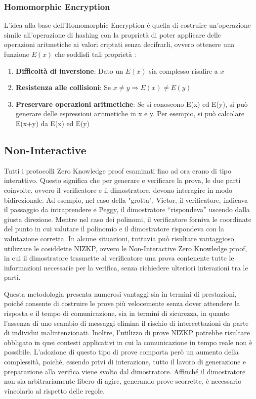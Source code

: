 \subsubsection{Homomorphic Encryption}

L'idea alla base dell'Homomorphic Encryption è quella di costruire un'operazione simile all'operazione di hashing con la
proprietà di poter applicare delle operazioni aritmetiche ai valori criptati senza decifrarli, ovvero ottenere una
funzione $E(x)$ che soddisfi tali proprietà :
\begin{enumerate}
    \item \textbf{Difficoltà di inversione}: Dato un  $E(x)$ sia complesso risalire a $x$
    \item \textbf{Resistenza alle collisioni}: Se $x \ne y \Rightarrow E(x) \ne E(y)$
    \item \textbf{Preservare operazioni aritmetiche}: Se si conoscono E(x) ed E(y), si può generare
    delle espressioni aritmetiche in x e y. Per esempio, si può calcolare E(x+y) da E(x) ed E(y)
\end{enumerate}
\clearpage

\subsection{Non-Interactive}
\label{sec:non-interactive}

Tutti i protocolli Zero Knowledge proof esaminati fino ad ora erano di tipo interattivo. Questo significa che per
generare e verificare la prova, le due parti coinvolte, ovvero il verificatore e il dimostratore, devono interagire in
modo bidirezionale. Ad esempio, nel caso della "grotta", Victor, il verificatore, indicava il passaggio da
intraprendere e Peggy, il dimostratore “rispondeva” uscendo dalla giusta direzione. Mentre nel caso dei
polinomi, il verificatore forniva le coordinate del punto in cui valutare il polinomio e il dimostratore rispondeva con
la valutazione corretta. In alcune situazioni, tuttavia può risultare vantaggioso utilizzare le cosiddette NIZKP, ovvero
le Non-Interactive Zero Knowledge proof, in cui il dimostratore trasmette al verificatore una prova contenente tutte le
informazioni necessarie per la verifica, senza richiedere ulteriori interazioni tra le parti. 

Questa metodologia presenta numerosi vantaggi sia in termini di prestazioni, poiché consente di costruire le prove più
velocemente senza dover attendere la risposta e il tempo di comunicazione, sia in termini di sicurezza, in quanto
l'assenza di uno scambio di messaggi elimina il rischio di intercettazioni da parte di individui malintenzionati.
Inoltre, l'utilizzo di prove NIZKP potrebbe risultare obbligato in quei contesti applicativi in cui la comunicazione in
tempo reale non è possibile. L'adozione di questo tipo di prove comporta però un aumento della complessità, poiché,
essendo privi di interazione, tutto il lavoro di generazione e preparazione alla verifica viene svolto dal dimostratore.
Affinché il dimostratore non sia arbitrariamente libero di agire, generando prove scorrette, è necessario vincolarlo
al rispetto delle regole. 

